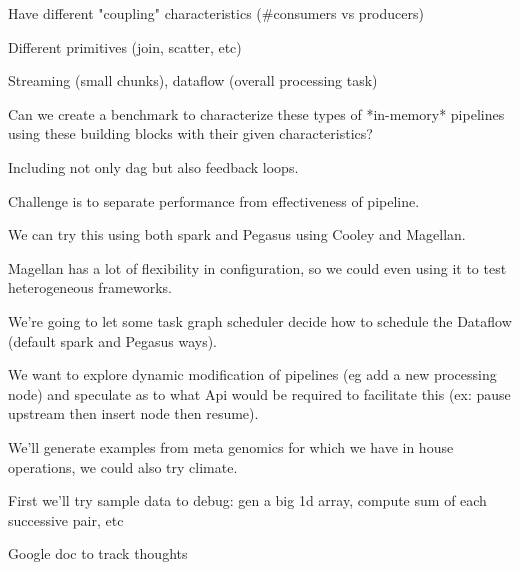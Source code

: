 \documentclass{sig-alternate}
\begin{document}
Have different "coupling" characteristics (\#consumers vs producers)

Different primitives (join, scatter, etc)

Streaming (small chunks), dataflow (overall processing task)

Can we create a benchmark to characterize these types of *in-memory*
pipelines using these building blocks with their given characteristics?

Including not only dag but also feedback loops.

Challenge is to separate performance from effectiveness of pipeline.

We can try this using both spark and Pegasus using Cooley and Magellan.

Magellan has a lot of flexibility in configuration, so we could even
using it to test heterogeneous frameworks.

We're going to let some task graph scheduler decide how to schedule the
Dataflow (default spark and Pegasus ways).

We want to explore dynamic modification of pipelines (eg add a new
processing node) and speculate as to what Api would be required to
facilitate this (ex: pause upstream then insert node then resume).

We'll generate examples from meta genomics for which we have in house
operations, we could also try climate.

First we'll try sample data to debug: gen a big 1d array, compute sum of
each successive pair, etc

Google doc to track thoughts
\end{document}
